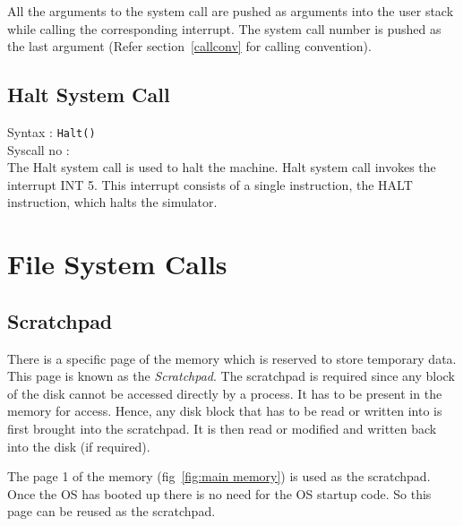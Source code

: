 \documentclass[11pt]{report}
\newcommand\counter[1]{\arabic{#1} \stepcounter{#1}}
\newcounter{syscall}
\begin{document}
All the arguments to the system call are pushed as arguments into the user stack while calling the corresponding interrupt. The system call number is pushed as the last argument (Refer section~\ref{callconv} for calling convention).

\section{Halt System Call}
\label{haltsyscall}

Syntax : \texttt{Halt()} \\
Syscall no : \counter{syscall} \\

The Halt system call is used to halt the machine. Halt system call invokes the interrupt INT 5. This interrupt consists of a single instruction, the HALT instruction, which halts the simulator.

\chapter{File System Calls}
\label{chp:file_system_calls}

\section{Scratchpad}
There is a specific page of the memory which is reserved to store temporary data. This page is known as the \textit{Scratchpad}. The scratchpad is required since any block of the disk cannot be accessed directly  by a process. It has to be present in the memory for access. Hence, any disk block that has to be read or written into is first brought into the scratchpad. It is then read or modified and written back into the disk (if required).

The page 1 of the memory (fig~\ref{fig:main memory}) is used as the scratchpad. Once the OS has booted up there is no need for the OS startup code. So this page can be reused as the scratchpad.
\end{document}
